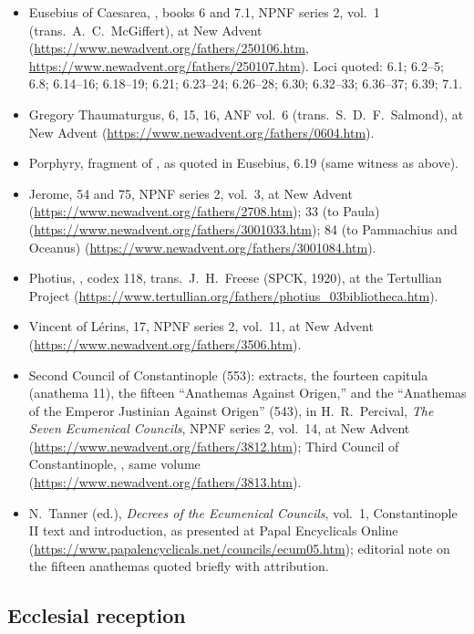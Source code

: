 \begin{itemize}
\item Eusebius of Caesarea, , books 6 and 7.1, NPNF
series 2, vol.~1 (trans.\ A.~C.~McGiffert), at New Advent
(\url{https://www.newadvent.org/fathers/250106.htm},
\url{https://www.newadvent.org/fathers/250107.htm}). Loci quoted: 6.1;
6.2--5; 6.8; 6.14--16; 6.18--19; 6.21; 6.23--24; 6.26--28; 6.30; 6.32--33;
6.36--37; 6.39; 7.1.
\item Gregory Thaumaturgus,  6, 15, 16, ANF vol.~6 (trans.\ S.~D.~F.~Salmond), at New Advent
(\url{https://www.newadvent.org/fathers/0604.htm}).
\item Porphyry, fragment of , as quoted in
Eusebius,  6.19 (same witness as above).
\item Jerome,  54 and 75, NPNF series 2, vol.~3,
at New Advent (\url{https://www.newadvent.org/fathers/2708.htm});
 33 (to Paula)
(\url{https://www.newadvent.org/fathers/3001033.htm});  84
(to Pammachius and Oceanus)
(\url{https://www.newadvent.org/fathers/3001084.htm}).
\item Photius, , codex 118, trans.\ J.~H.~Freese (SPCK,
1920), at the Tertullian Project
(\url{https://www.tertullian.org/fathers/photius_03bibliotheca.htm}).
\item Vincent of L\'erins,  17, NPNF series 2,
vol.~11, at New Advent (\url{https://www.newadvent.org/fathers/3506.htm}).
\item Second Council of Constantinople (553): extracts, the fourteen
capitula (anathema 11), the fifteen ``Anathemas Against Origen,'' and the
``Anathemas of the Emperor Justinian Against Origen'' (543), in
H.~R.~Percival, \textit{The Seven Ecumenical Councils}, NPNF series 2,
vol.~14, at New Advent (\url{https://www.newadvent.org/fathers/3812.htm});
Third Council of Constantinople, , same volume
(\url{https://www.newadvent.org/fathers/3813.htm}).
\item N.~Tanner (ed.), \textit{Decrees of the Ecumenical Councils}, vol.~1,
Constantinople II text and introduction, as presented at Papal Encyclicals
Online (\url{https://www.papalencyclicals.net/councils/ecum05.htm});
editorial note on the fifteen anathemas quoted briefly with attribution.
\end{itemize}

\subsection*{Ecclesial reception}

